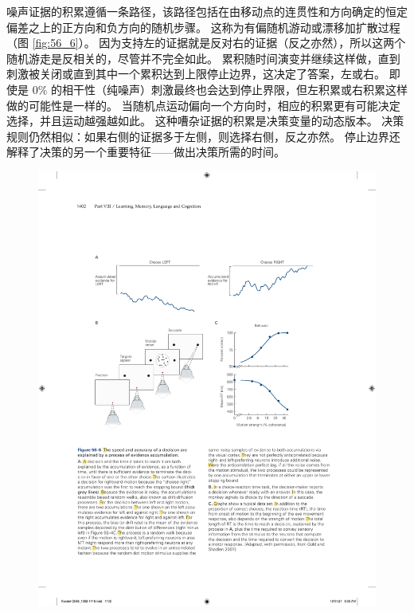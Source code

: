 噪声证据的积累遵循一条路径，该路径包括在由移动点的连贯性和方向确定的恒定偏差之上的正方向和负方向的随机步骤。
这称为有偏随机游动或漂移加扩散过程（图 \ref{fig:56_6}）。
因为支持左的证据就是反对右的证据（反之亦然），所以这两个随机游走是反相关的，尽管并不完全如此。
累积随时间演变并继续这样做，直到刺激被关闭或直到其中一个累积达到上限停止边界，这决定了答案，左或右。
即使是 0\% 的相干性（纯噪声）刺激最终也会达到停止界限，但左积累或右积累这样做的可能性是一样的。
当随机点运动偏向一个方向时，相应的积累更有可能决定选择，并且运动越强越如此。
这种嘈杂证据的积累是决策变量的动态版本。
决策规则仍然相似：如果右侧的证据多于左侧，则选择右侧，反之亦然。
停止边界还解释了决策的另一个重要特征——做出决策所需的时间。


\begin{figure}[htbp]
	\centering
	\includegraphics[width=0.8\linewidth]{chap56/fig_56_6}

\end{figure}
